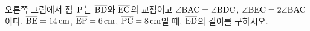\noindent\begin{minipage}[t]{0.58\linewidth}\vspace{0pt}\raggedright 오른쪽 그림에서 점~$\mathrm{P}$는 $\overline{\mathrm{BD}}$와 $\overline{\mathrm{EC}}$의 교점이고 $\angle\mathrm{BAC}=\angle\mathrm{BDC}$, $\angle\mathrm{BEC}=2\angle\mathrm{BAC}$이다. $\overline{\mathrm{BE}}=14\,\mathrm{cm}$, $\overline{\mathrm{EP}}=6\,\mathrm{cm}$, $\overline{\mathrm{PC}}=8\,\mathrm{cm}$일 때, $\overline{\mathrm{ED}}$의 길이를 구하시오.\end{minipage}\hfill\begin{minipage}[t]{0.4\linewidth}\vspace{0pt}\centering \resizebox{\ifdim\width>\linewidth\linewidth\else\width\fi}{!}{}\end{minipage}\par
